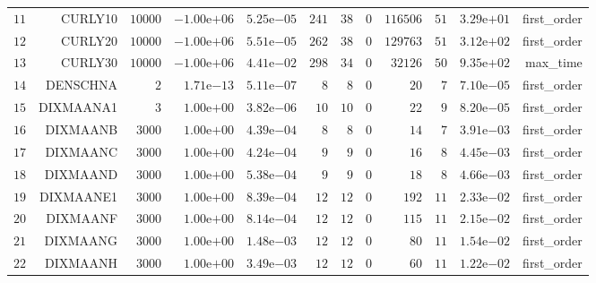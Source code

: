 \begin{longtable}{rrrrrrrrrrrr}
  \(    11\) & CURLY10 & \( 10000\) & \(-1.00\)e\(+06\) & \( 5.25\)e\(-05\) & \(   241\) & \(    38\) & \(     0\) & \(116506\) & \(    51\) & \( 3.29\)e\(+01\) & first\_order \\
  \(    12\) & CURLY20 & \( 10000\) & \(-1.00\)e\(+06\) & \( 5.51\)e\(-05\) & \(   262\) & \(    38\) & \(     0\) & \(129763\) & \(    51\) & \( 3.12\)e\(+02\) & first\_order \\
  \(    13\) & CURLY30 & \( 10000\) & \(-1.00\)e\(+06\) & \( 4.41\)e\(-02\) & \(   298\) & \(    34\) & \(     0\) & \( 32126\) & \(    50\) & \( 9.35\)e\(+02\) & max\_time \\
  \(    14\) & DENSCHNA & \(     2\) & \( 1.71\)e\(-13\) & \( 5.11\)e\(-07\) & \(     8\) & \(     8\) & \(     0\) & \(    20\) & \(     7\) & \( 7.10\)e\(-05\) & first\_order \\
  \(    15\) & DIXMAANA1 & \(     3\) & \( 1.00\)e\(+00\) & \( 3.82\)e\(-06\) & \(    10\) & \(    10\) & \(     0\) & \(    22\) & \(     9\) & \( 8.20\)e\(-05\) & first\_order \\
  \(    16\) & DIXMAANB & \(  3000\) & \( 1.00\)e\(+00\) & \( 4.39\)e\(-04\) & \(     8\) & \(     8\) & \(     0\) & \(    14\) & \(     7\) & \( 3.91\)e\(-03\) & first\_order \\
  \(    17\) & DIXMAANC & \(  3000\) & \( 1.00\)e\(+00\) & \( 4.24\)e\(-04\) & \(     9\) & \(     9\) & \(     0\) & \(    16\) & \(     8\) & \( 4.45\)e\(-03\) & first\_order \\
  \(    18\) & DIXMAAND & \(  3000\) & \( 1.00\)e\(+00\) & \( 5.38\)e\(-04\) & \(     9\) & \(     9\) & \(     0\) & \(    18\) & \(     8\) & \( 4.66\)e\(-03\) & first\_order \\
  \(    19\) & DIXMAANE1 & \(  3000\) & \( 1.00\)e\(+00\) & \( 8.39\)e\(-04\) & \(    12\) & \(    12\) & \(     0\) & \(   192\) & \(    11\) & \( 2.33\)e\(-02\) & first\_order \\
  \(    20\) & DIXMAANF & \(  3000\) & \( 1.00\)e\(+00\) & \( 8.14\)e\(-04\) & \(    12\) & \(    12\) & \(     0\) & \(   115\) & \(    11\) & \( 2.15\)e\(-02\) & first\_order \\
  \(    21\) & DIXMAANG & \(  3000\) & \( 1.00\)e\(+00\) & \( 1.48\)e\(-03\) & \(    12\) & \(    12\) & \(     0\) & \(    80\) & \(    11\) & \( 1.54\)e\(-02\) & first\_order \\
  \(    22\) & DIXMAANH & \(  3000\) & \( 1.00\)e\(+00\) & \( 3.49\)e\(-03\) & \(    12\) & \(    12\) & \(     0\) & \(    60\) & \(    11\) & \( 1.22\)e\(-02\) & first\_order \\

\end{longtable}
